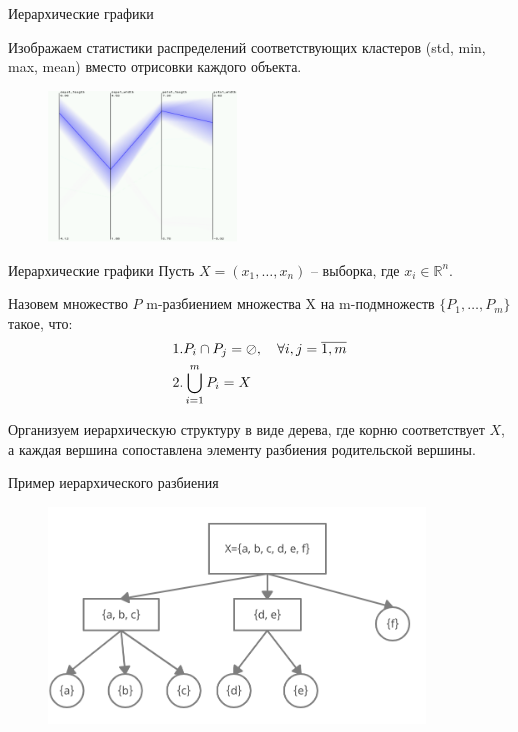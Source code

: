 \documentclass[fleqn, xcolor=x11names]{beamer}
\begin{document}
\begin{frame}{Иерархические графики}

    Изображаем статистики распределений соответствующих кластеров (std, min, max, mean)
    вместо отрисовки каждого объекта.

    \begin{figure}[htb]
        \centering
        \includegraphics[width=5cm]{hierarchical_1.png}
    \end{figure}
\end{frame}

\begin{frame}{Иерархические графики}
    Пусть $X=(x_1,\ldots,x_n)$ -- выборка, где $x_i\in \mathbb{R}^n$. 

    \vspace{10px}

    Назовем множество $P$ m-разбиением множества X на m-подмножеств $\{P_1,\ldots,P_m\}$
    такое, что:
    \begin{align}
        \notag &1. P_i \cap  P_j = \oslash, \hspace{10px} \forall i,j =\overline{1,m} \\
        \notag &2. \bigcup\limits_{i=1}^{m} P_i = X 
    \end{align}

    Организуем иерархическую структуру в виде дерева, где корню соответствует $X$, 
    а каждая вершина сопоставлена элементу разбиения родительской вершины.
\end{frame}

\begin{frame}{Пример иерархического разбиения}
    \begin{figure}[htb]
        \centering
        \includegraphics[width=10cm]{hierarchical_graph.png}
    \end{figure}

\end{frame}
\end{document}
